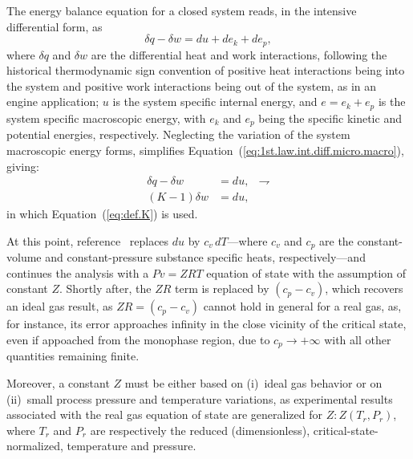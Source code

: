 \documentclass[fleqn,11pt]{SelfArx}
\begin{document}
    The energy balance equation for a closed system reads, in the intensive  differential  form,
    as
    \begin{equation}
        \delta q - \delta w = du + de_k + de_p,
        \label{eq:1st.law.int.diff.micro.macro}
    \end{equation}
    \noindent where $\delta q$ and $\delta w$ are the differential heat and  work  interactions,
    following the historical thermodynamic sign convention of positive heat  interactions  being
    into the system and positive work interactions being out of the  system,  as  in  an  engine
    application; $u$ is the system specific internal energy, and $e = e_k + e_p$ is  the  system
    specific macroscopic energy, with $e_k$ and $e_p$ being the specific kinetic  and  potential
    energies, respectively. Neglecting the variation of the system macroscopic energy forms,
    simplifies Equation~(\ref{eq:1st.law.int.diff.micro.macro}), giving:
    \begin{align}
        \delta q - \delta w & = du, & \rightharpoondown
        \label{eq:1st.law.int.diff} \\
        (K-1)\delta w & = du,
        \label{eq:1st.law.int.diff.K}
    \end{align}
    \noindent in which Equation~(\ref{eq:def.K}) is used.

    At  this   point,   reference~\cite{2012-ChristiansJ-IntJMechEngEduc}   replaces   $du$   by
    $c_v\,dT$---where $c_v$ and $c_p$ are the constant-volume  and  constant-pressure  substance
    specific heats, respectively---and continues the analysis with a  $Pv  =  ZRT$  equation  of
    state with the assumption of constant $Z$. Shortly after, the $ZR$ term is replaced by $(c_p
    - c_v)$, which recovers an ideal gas result, as $ZR = (c_p - c_v)$ cannot  hold  in  general
    for a real gas, as, for instance, its error approaches infinity in the close vicinity of the
    critical state, even if appoached from the monophase region, due to $c_p \to  +\infty$  with
    all other quantities remaining finite.

    Moreover, a constant $Z$ must be either based on (i)~ideal gas  behavior  or  on  (ii)~small
    process pressure and temperature variations, as experimental  results  associated  with  the
    real gas equation of state are generalized for $Z\!:\!Z(T_r, P_r)$, where  $T_r$  and  $P_r$
    are respectively the reduced  (dimensionless),  critical-state-normalized,  temperature  and
    pressure.
\end{document}
